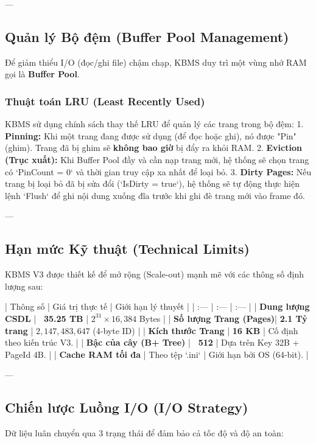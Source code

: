 ---

\subsection{Quản lý Bộ đệm (Buffer Pool Management)}

Để giảm thiểu I/O (đọc/ghi file) chậm chạp, KBMS duy trì một vùng nhớ RAM gọi là \textbf{Buffer Pool}.

\subsubsection{Thuật toán LRU (Least Recently Used)}
KBMS sử dụng chính sách thay thế LRU để quản lý các trang trong bộ đệm:
1.  \textbf{Pinning:} Khi một trang đang được sử dụng (để đọc hoặc ghi), nó được "Pin" (ghim). Trang đã bị ghim sẽ \textbf{không bao giờ} bị đẩy ra khỏi RAM.
2.  \textbf{Eviction (Trục xuất):} Khi Buffer Pool đầy và cần nạp trang mới, hệ thống sẽ chọn trang có `PinCount = 0` và thời gian truy cập xa nhất để loại bỏ.
3.  \textbf{Dirty Pages:} Nếu trang bị loại bỏ đã bị sửa đổi (`IsDirty = true`), hệ thống sẽ tự động thực hiện lệnh `Flush` để ghi nội dung xuống đĩa trước khi ghi đè trang mới vào frame đó.

---

\subsection{Hạn mức Kỹ thuật (Technical Limits)}

KBMS V3 được thiết kế để mở rộng (Scale-out) mạnh mẽ với các thông số định lượng sau:

| Thông số | Giá trị thực tế | Giới hạn lý thuyết |
| :--- | :--- | :--- |
| \textbf{Dung lượng CSDL} | \textbf{~35.25 TB} | $2^{31} \times 16,384$ Bytes |
| \textbf{Số lượng Trang (Pages)}| \textbf{2.1 Tỷ trang} | $2,147,483,647$ (4-byte ID) |
| \textbf{Kích thước Trang} | \textbf{16 KB} | Cố định theo kiến trúc V3. |
| \textbf{Bậc của cây (B+ Tree)} | \textbf{~512} | Dựa trên Key 32B + PageId 4B. |
| \textbf{Cache RAM tối đa} | Theo tệp `.ini` | Giới hạn bởi OS (64-bit). |

---

\subsection{Chiến lược Luồng I/O (I/O Strategy)}

Dữ liệu luân chuyển qua 3 trạng thái để đảm bảo cả tốc độ và độ an toàn:

